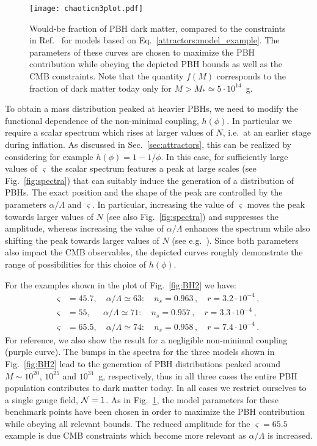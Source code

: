 \begin{figure}
%
\centering
\texttt{[image: chaoticn3plot.pdf]}\hfill
%
\caption{Would-be fraction of PBH dark matter, compared to the constraints in Ref.~\cite{Carr:2009jm,Carr:2016drx} for models based on Eq.~\eqref{attractors:model_example}. The parameters of these curves are chosen to maximize the PBH contribution while obeying the depicted PBH bounds as well as the CMB constraints. 
 Note that the quantity $f(M)$ corresponds to the fraction of dark matter today  only for $M > M_* \simeq 5 \cdot 10^{14}$~g.}
\label{fig:BH1}
%
\end{figure}



To obtain a mass distribution peaked at heavier PBHs, we need to modify the functional dependence of the non-minimal coupling, $h(\phi)$. In particular we require a scalar spectrum which rises at larger values of $N$, i.e.\ at an earlier stage during inflation. As discussed in Sec.~\ref{sec:attractors}, this can be realized by considering for example $h(\phi) = 1 - 1/\phi$. In this case, for sufficiently large values of $\varsigma$ the scalar spectrum features a peak at large scales (see Fig.~\ref{fig:spectra}) that can suitably induce the generation of a distribution of PBHs. The exact position and the shape of the peak are controlled by the parameters $\alpha/\Lambda$ and $\varsigma$.
In particular, increasing the value of $\varsigma$ moves the peak towards larger values of $N$ (see also Fig.~\ref{fig:spectra}) and suppresses the amplitude, whereas increasing the value of $\alpha/\Lambda$ enhances the spectrum while also shifting the peak towards larger values of $N$ (see e.g.\ \cite{Domcke:2016bkh}). 
Since both parameters also impact the CMB observables, the depicted curves roughly demonstrate the range of possibilities for this choice of $h(\phi)$.


 For the examples shown in the plot of Fig.~\ref{fig:BH2} we have: 
\begin{align}
\varsigma &= 45.7, \quad \alpha/\Lambda \simeq 63: \quad n_s = 0.963 \,, \quad r = 3.2 \cdot 10^{-4} \,,\\
\varsigma &= 55, \quad \ \ \alpha/\Lambda \simeq 71: \quad n_s = 0.957 \,, \quad r = 3.3 \cdot 10^{-4}  \,,
\\\varsigma &= 65.5, \quad \alpha/\Lambda \simeq 74: \quad n_s = 0.958 \,, \quad r = 7.4 \cdot 10^{-4} \,.
\end{align}
For reference, we also show the result for a negligible non-minimal coupling (purple curve). The bumps in the spectra for the three models shown in Fig.~\ref{fig:BH2} lead to the generation of PBH distributions peaked around $M \sim 10^{20}, \, 10^{25}$ and $10^{31}$~g, respectively, thus in all three cases the entire PBH population contributes to dark matter today. In all cases we restrict ourselves to a single gauge field, ${\cal N} = 1$. As in Fig.~\ref{fig:BH1}, the model parameters for these benchmark points have been chosen in order to maximize the PBH contribution while obeying all relevant bounds. The reduced amplitude for the $\varsigma = 65.5$ example is due CMB constraints which become more relevant as $\alpha/\Lambda$ is increased. 


